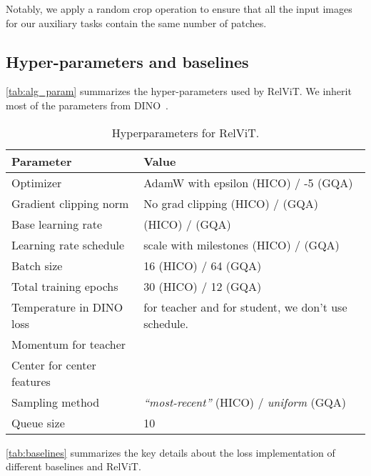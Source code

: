 \documentclass{article} \usepackage{iclr2022_conference,times}
\begin{document}
Notably, we apply a random crop operation to ensure that all the input images for our auxiliary tasks contain the same number of patches.

\subsection{Hyper-parameters and baselines}

\autoref{tab:alg_param} summarizes the hyper-parameters used by RelViT. We inherit most of the parameters from DINO~\citep{dino}.

\begin{table}[H]
\centering
\caption{Hyperparameters for RelViT.} 
\begin{tabular}{l|l}
\toprule
Parameter &  Value\\
\midrule
Optimizer &AdamW with epsilon  (HICO) / {-5} (GQA)\\
Gradient clipping norm & No grad clipping (HICO) /  (GQA) \\
Base learning rate &  (HICO) /  (GQA) \\
Learning rate schedule &  scale with milestones  (HICO) /  (GQA)\\
Batch size & 16 (HICO) / 64 (GQA) \\
Total training epochs & 30 (HICO) / 12 (GQA) \\
\midrule
Temperature  in DINO loss &  for teacher and  for student, we don't use schedule. \\
Momentum  for teacher &  \\
Center  for center features &  \\
\midrule
Sampling method & \textit{``most-recent''} (HICO) / \textit{uniform} (GQA) \\
Queue size  & 10 \\
\bottomrule
\end{tabular}
\label{tab:alg_param}
\end{table}

\autoref{tab:baselines} summarizes the key details about the loss implementation of different baselines and RelViT.
\end{document}
